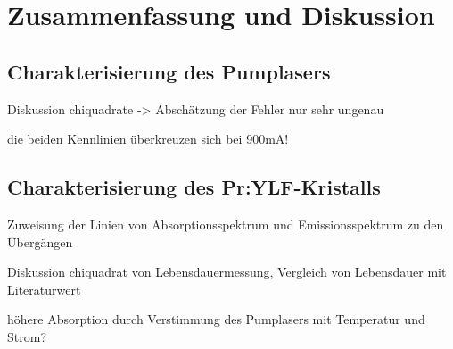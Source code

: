 \section{Zusammenfassung und Diskussion}

\subsection{Charakterisierung des Pumplasers}

Diskussion chiquadrate -> Abschätzung der Fehler nur sehr ungenau

die beiden Kennlinien überkreuzen sich bei 900mA!

\subsection{Charakterisierung des Pr:YLF-Kristalls}

Zuweisung der Linien von Absorptionsspektrum und Emissionsspektrum zu den Übergängen 

Diskussion chiquadrat von Lebensdauermessung, Vergleich von Lebensdauer mit Literaturwert

höhere Absorption durch Verstimmung des Pumplasers mit Temperatur und Strom?